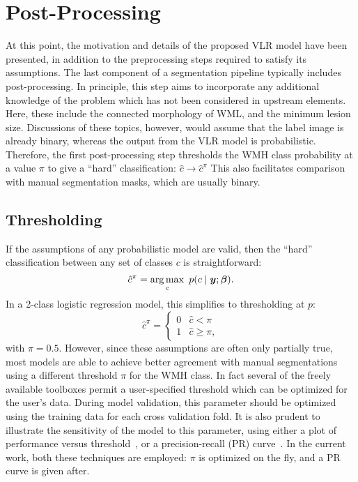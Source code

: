 \section{Post-Processing}\label{s:vlr-post}
At this point, the motivation and details of the proposed VLR model have been presented,
in addition to the preprocessing steps required to satisfy its assumptions.
The last component of a segmentation pipeline typically includes post-processing. 
In principle, this step aims to incorporate any additional knowledge of the problem
which has not been considered in upstream elements.
Here, these include the connected morphology of WML, and the minimum lesion size.
Discussions of these topics, however, would assume that the label image is already binary,
whereas the output from the VLR model is probabilistic.
Therefore, the first post-processing step
thresholds the WMH class probability at a value $\pi$ to give a ``hard'' classification:
$\hat{c}\rightarrow \hat{c}^{\pi}$
This also facilitates comparison with manual segmentation masks, which are usually binary.
\subsection{Thresholding}\label{ss:vlr-thr}
If the assumptions of any probabilistic model are valid,
then the ``hard'' classification between any set of classes $c$ is straightforward:
\begin{equation}
  \hat{c}^{\pi} = \underset{c}{\arg\max}\enspace p(c\mid\bm{y};\bm{\beta}).
\end{equation}
In a 2-class logistic regression model, this simplifies to thresholding at $p$:
\begin{equation}
  \hat{c}^{\pi} = \begin{cases} 0 & \hat{c} < \pi \\ 1 & \hat{c} \ge \pi, \end{cases}
\end{equation}
with $\pi = 0.5$.
However, since these assumptions are often only partially true,
most models are able to achieve better agreement with manual segmentations
using a different threshold $\pi$ for the WMH class.
In fact several of the freely available toolboxes%
permit a user-specified threshold which can be optimized for the user's data.
During model validation,
this parameter should be optimized using the training data for each cross validation fold.
It is also prudent to illustrate the sensitivity of the model to this parameter, using either 
a plot of performance versus threshold~\cite{Steenwijk2013}, or
a precision-recall (PR) curve~\cite{Arbelaez2011}.
In the current work, both these techniques are employed:
$\pi$ is optimized on the fly, and a PR curve is given after.
